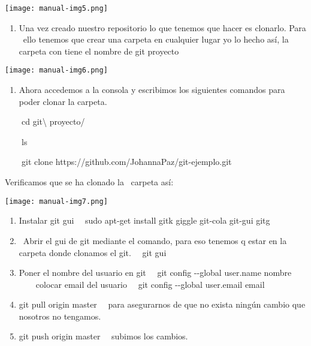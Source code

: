 \documentclass[a4paper]{article}
\newcounter{saveenum}
\newcommand\liststyleLi{%
\renewcommand\theenumi{\arabic{enumi}}
\renewcommand\theenumii{\alph{enumii}}
\renewcommand\theenumiii{\roman{enumiii}}
\renewcommand\theenumiv{\arabic{enumiv}}
\renewcommand\labelenumi{\theenumi.}
\renewcommand\labelenumii{\theenumii.}
\renewcommand\labelenumiii{\theenumiii.}
\renewcommand\labelenumiv{\theenumiv.}
}
\begin{document}
\begin{center}
\texttt{[image: manual-img5.png]}
\end{center}

\bigskip

\liststyleLi
\setcounter{saveenum}{\value{enumi}}
\begin{enumerate}
\setcounter{enumi}{\value{saveenum}}
\item {\sffamily
Una vez creado nuestro repositorio lo que tenemos que hacer es clonarlo.
Para \ ello tenemos que crear una carpeta en cualquier lugar yo lo
hecho as\'i, la carpeta con tiene el nombre de git proyecto}
\end{enumerate}


\begin{center}
\texttt{[image: manual-img6.png]}
\end{center}
\liststyleLi
\setcounter{saveenum}{\value{enumi}}
\begin{enumerate}
\setcounter{enumi}{\value{saveenum}}
\item {\sffamily
Ahora accedemos a la consola y escribimos los siguientes comandos para
poder clonar la carpeta.}
\end{enumerate}
{\sffamily
\ \ \ \ cd git{\textbackslash} proyecto/}

{\sffamily
\ \ \ \ ls}

{\sffamily
\ \ \ \ git clone https://github.com/JohannaPaz/git-ejemplo.git}

{\sffamily
Verificamos que se ha clonado la \ carpeta as\'i:}



\begin{center}
\texttt{[image: manual-img7.png]}
\end{center}
\liststyleLi
\setcounter{saveenum}{\value{enumi}}
\begin{enumerate}
\setcounter{enumi}{\value{saveenum}}
\item {\sffamily
Instalar git gui\newline
\ \  sudo apt-get install gitk giggle git-cola git-gui gitg}
\item {\sffamily
\ Abrir el gui de git mediante el comando, para eso tenemos q estar en
la carpeta donde clonamos el git.\newline
 \ \ git gui}
\item {\sffamily
Poner el nombre del usuario en git\newline
 \ \ git config -{}-global user.name nombre\newline
 \ \ \ \ colocar email del usuario\newline
 \ \ git config -{}-global user.email email}
\item {\sffamily
git pull origin master\newline
\ \  para asegurarnos de que no exista ning\'un cambio que nosotros no
tengamos.}
\item {\sffamily
git push origin master\newline
\ \ subimos los cambios.}
\end{enumerate}

\bigskip
\end{document}
